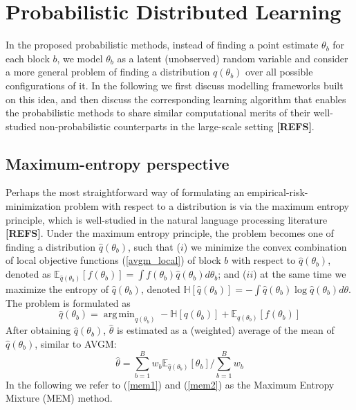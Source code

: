 \documentclass{article}
\DeclareMathOperator*{\argmin}{arg\,min}
\newcommand{\1}[0]{\ensuremath{\boldsymbol{1}}\xspace}
\begin{document}

\section{Probabilistic Distributed Learning}\label{proposed_frameworks}

In the proposed probabilistic methods, instead of finding a point estimate $\theta_b$ for each block $b$, we model $\theta_b$ as a latent (unobserved) random variable and consider a more general problem of finding a distribution $q(\theta_b)$ over all possible configurations of it. In the following we first discuss modelling frameworks built on this idea, and then discuss the corresponding learning algorithm that enables the probabilistic methods to share similar computational merits of their well-studied non-probabilistic counterparts in the large-scale setting \textbf{[REFS]}.

\subsection{Maximum-entropy perspective}\label{MEM}
Perhaps the most straightforward way of formulating an empirical-risk-minimization problem with respect to a distribution is via the maximum entropy principle, which is well-studied in the natural language processing literature \textbf{[REFS]}. Under the maximum entropy principle, the problem becomes one of finding a distribution $\hat q(\theta_b)$, such that ($i$) we minimize the convex combination of local objective functions (\ref{avgm_local}) of block $b$ with respect to $\hat q(\theta_b)$, denoted as $\mathbb{E}_{\hat q(\theta_b)}[f(\theta_b)] = \int f(\theta_b)\hat q(\theta_b) d\theta_b$; and ($ii$) at the same time we maximize the entropy of $\hat q(\theta_b)$, denoted $\mathbb{H}[\hat q(\theta_b)] = -\int \hat q(\theta_b)\log  \hat q(\theta_b) d\theta$. The problem is formulated as
\begin{equation}\label{mem1}
\textstyle\hat q(\theta_b) =\argmin_{q(\theta_b)} -\mathbb{H}[q(\theta_b)] +  \mathbb{E}_{q(\theta_b) }[f(\theta_b)]
\end{equation}
After obtaining $\hat q(\theta_b)$, $\hat\theta$ is estimated as a (weighted) average of the mean of $\hat q(\theta_b)$, similar to AVGM: 
\begin{equation}\label{mem2}
\hat\theta = \textstyle\sum_{b=1}^Bw_b\mathbb{E}_{\hat q(\theta_b) }[\theta_b]/\sum_{b=1}^Bw_b
\end{equation}
In the following we refer to (\ref{mem1}) and (\ref{mem2}) as the Maximum Entropy Mixture (MEM) method. 
\end{document}
